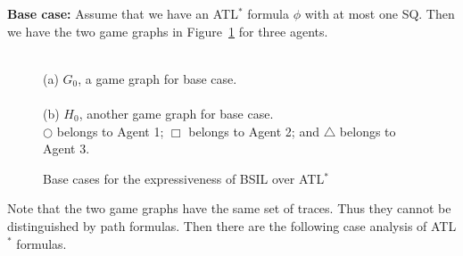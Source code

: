 \documentclass[11pt]{article}
\newcommand{\pfrr}{\Box}
\begin{document}
\noindent 
{\bf Base case:} Assume that we have an ATL$^*$ formula 
$\phi$ with at most one SQ.  
Then we have the two game graphs in Figure~\ref{fig.gg.exp}
for three agents.
\begin{figure}[t]\begin{center}
\\
(a) $G_0$, a game graph for base case.\\
\\
(b) $H_0$, another game graph for base case.\\
$\bigcirc$ belongs to Agent  1; $\pfrr$ belongs to Agent 2; and 
$\triangle$ belongs to Agent 3.
\end{center}
\caption{Base cases for the expressiveness of BSIL over ATL$^*$}
\label{fig.gg.exp}
\end{figure}
Note that the two game graphs have the same set of traces.
Thus they cannot be distinguished by path formulas.
Then there are the following case analysis of ATL$^*$ formulas.
\end{document}
